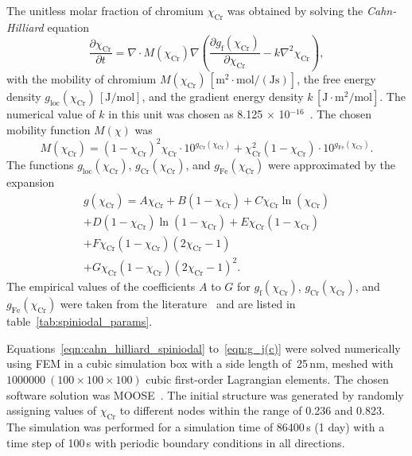 \documentclass[preprint, 5p, times, twocolumn]{elsarticle}
\begin{document}
The unitless molar fraction of chromium $\chi_{\text{Cr}}$ was obtained by solving the \emph{Cahn-Hilliard} equation~\cite{cahn1958free, cahn1961on, moosetutorial}
%
\begin{equation}
\label{eqn:cahn_hilliard_spiniodal}
    \dfrac{\partial \chi_{\text{Cr}}}{ \partial t} = \nabla \cdot M(\chi_{\text{Cr}}) \nabla \left( \dfrac{\partial g_{\text{f}}(\chi_{\text{Cr}})}{\partial \chi_{\text{Cr}}} - k \nabla^2 \chi_{\text{Cr}} \right),
\end{equation}
%
with the mobility of chromium $M(\chi_{\text{Cr}})\,[\text{m}^2\cdot\text{mol}/(\text{Js})]$, the free energy density $g_{\text{loc}}(\chi_{\text{Cr}})\,[\text{J}/\text{mol}]$, and the gradient energy density $k\,[\text{J}\cdot\text{m}^2/\text{mol}]$. The numerical value of $k$ in this unit was chosen as 8.125 $\times$ 10$^{-16}$~\cite{moosetutorial}. The chosen mobility function $M(\chi)$ was
%
\begin{equation}
    M(\chi_{\text{Cr}}) = (1-\chi_{\text{Cr}})^2 \chi_{\text{Cr}} \cdot 10^{g_{\text{Cr}}(\chi_{\text{Cr}})} + \chi_{\text{Cr}}^2 (1-\chi_{\text{Cr}}) \cdot 10^{g_{\text{Fe}}(\chi_{\text{Cr}})}.
\end{equation}
%
The functions $g_{\text{loc}}(\chi_{\text{Cr}})$, $g_{\text{Cr}}(\chi_{\text{Cr}})$, and $g_{\text{Fe}}(\chi_{\text{Cr}})$ were approximated by the expansion
%
\begin{multline}
\label{eqn:g_j(c)}
        g(\chi_{\text{Cr}}) = A \chi_{\text{Cr}} + B (1-\chi_{\text{Cr}}) + C \chi_{\text{Cr}} \ln(\chi_{\text{Cr}})\\
        + D(1-\chi_{\text{Cr}}) \ln(1-\chi_{\text{Cr}}) + E \chi_{\text{Cr}}(1-\chi_{\text{Cr}}) \\
        + F \chi_{\text{Cr}}(1-\chi_{\text{Cr}})(2\chi_{\text{Cr}}-1)\\ 
        + G \chi_{\text{Cr}}(1-\chi_{\text{Cr}})(2\chi_{\text{Cr}}-1)^2 .
\end{multline}
%
The empirical values of the coefficients $A$ to $G$ for $g_{\text{f}}(\chi_{\text{Cr}})$, $g_{\text{Cr}}(\chi_{\text{Cr}})$, and $g_{\text{Fe}}(\chi_{\text{Cr}})$ were taken from the literature~\cite{moosetutorial} and are listed in table~\ref{tab:spiniodal_params}.

Equations~\ref{eqn:cahn_hilliard_spiniodal} to~\ref{eqn:g_j(c)} were solved numerically using FEM in a cubic simulation box with a side length of~25\,nm, meshed with $1000000~(100 \times 100 \times 100)$ cubic first-order Lagrangian elements. The chosen software solution was MOOSE~\cite{moose}. The initial structure was generated by randomly assigning values of $\chi_{\text{Cr}}$ to different nodes within the range of 0.236 and 0.823. The simulation was performed for a simulation time of 86400\,s (1 day) with a time step of 100\,s with periodic boundary conditions in all directions.
\end{document}
